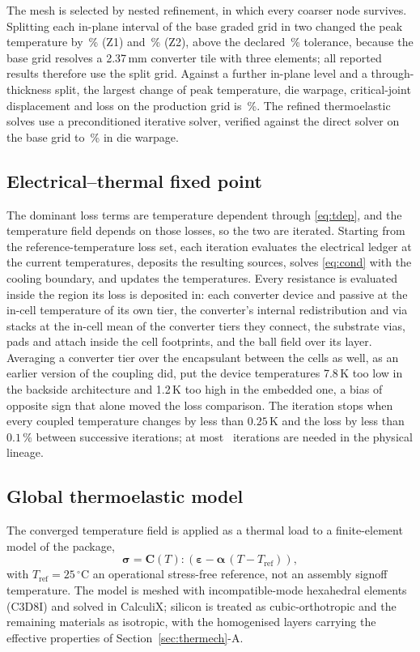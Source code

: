 \documentclass[journal]{IEEEtran}
\begin{document}
The mesh is selected by nested refinement, in which every coarser node survives. Splitting
each in-plane interval of the base graded grid in two changed the peak temperature by
\MeshBaseTmaxZone\,\% (Z1) and \MeshBaseTmaxZtwo\,\% (Z2), above the declared
\MeshTol\,\% tolerance, because the base grid resolves a 2.37\,mm converter tile with three
elements; all reported results therefore use the split grid. Against a further in-plane
level and a through-thickness split, the largest change of peak temperature, die warpage,
critical-joint displacement and loss on the production grid is \MeshWorstProd\,\%.
\MeshBoundSentence The refined thermoelastic solves use a preconditioned iterative solver, verified against the
direct solver on the base grid to \ErrSolverIter\,\% in die warpage.
\subsection{Electrical--thermal fixed point}
The dominant loss terms are temperature dependent through \eqref{eq:tdep}, and the
temperature field depends on those losses, so the two are iterated. Starting from the
reference-temperature loss set, each iteration evaluates the electrical ledger at the current
temperatures, deposits the resulting sources, solves \eqref{eq:cond} with the cooling
boundary, and updates the temperatures. Every resistance is evaluated inside the region its
loss is deposited in: each converter device and passive at the in-cell temperature of its own
tier, the converter's internal redistribution and via stacks at the in-cell mean of the
converter tiers they connect, the substrate vias, pads and attach inside the cell footprints,
and the ball field over its layer. Averaging a converter tier over the encapsulant between the cells
as well, as an earlier version of the coupling did, put the device temperatures 7.8\,K too
low in the backside architecture and 1.2\,K too high in the embedded one, a bias of opposite
sign that alone moved the loss comparison. The iteration stops when every coupled temperature
changes by less than $0.25$\,K and the loss by less than $0.1$\,\% between successive
iterations; at most \EtIters\ iterations are needed in the physical lineage.


\subsection{Global thermoelastic model}
The converged temperature field is applied as a thermal load to a finite-element model of the
package,
\begin{equation}
\boldsymbol{\sigma} = \mathbf{C}(T) : \left( \boldsymbol{\varepsilon}
- \boldsymbol{\alpha}\,(T-T_{\mathrm{ref}}) \right),
\label{eq:const}
\end{equation}
with $T_{\mathrm{ref}} = 25\,^{\circ}$C an operational stress-free reference, not an assembly
signoff temperature. The model is meshed with incompatible-mode hexahedral elements
(C3D8I) and solved in CalculiX; silicon is treated as cubic-orthotropic and the remaining
materials as isotropic, with the homogenised layers carrying the effective properties of
Section~\ref{sec:thermech}-A.
\end{document}
